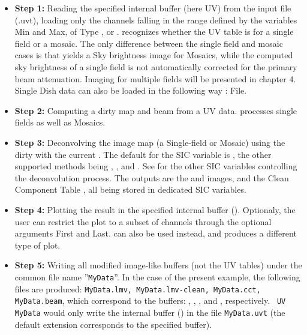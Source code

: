 \begin{itemize}
\item \textbf{Step 1:} Reading  the  specified  internal  buffer (here 
UV) from the input file (.uvt), loading only the channels falling in 
the range defined by the variables Min and Max, of Type , 
 or . \imager{} recognizes whether the UV 
table is for a single field or a mosaic. The only difference between 
the single field and mosaic cases is that \imager{} yields a Sky 
brightness image for Mosaics, while the computed sky brightness of a 
single field is not automatically corrected for the primary beam 
attenuation. Imaging for multiple fields will be presented in chapter 
4. Single Dish data can also be loaded  in the following way : 
 File.
\item \textbf{Step 2:} Computing a  dirty  map  and  beam from a UV data. 
 processes  single fields as well as Mosaics.
\item \textbf{Step 3:} Deconvolving the  image map (a Single-field or Mosaic) 
using the dirty  with the current . The default 
for the SIC variable  is ,  the other 
supported methods being , ,  and 
. See  for the other SIC variables 
controlling the deconvolution process. The outputs are the  and 
 images, and the Clean Component Table , all being stored 
in dedicated SIC variables.
\item \textbf{Step 4:} Plotting the result in the specified internal 
buffer (). Optionaly, the user can restrict the plot to a 
subset of channels through the optional arguments First and Last. 
 can also be used instead, and produces a different 
type of plot.
\item \textbf{Step 5:}  Writing all modified image-like buffers (not 
the UV  tables) under the common file name ''\texttt{MyData}''. In the case of the 
present example, the following files are produced: \texttt{MyData.lmv, 
MyData.lmv-clean, MyData.cct, MyData.beam}, which correspond to the 
buffers: , , , and , respectively. 
\texttt{ UV MyData} would only write the internal buffer () in the 
file \texttt{MyData.uvt} (the default extension corresponds to the specified 
buffer).
\end{itemize}    

